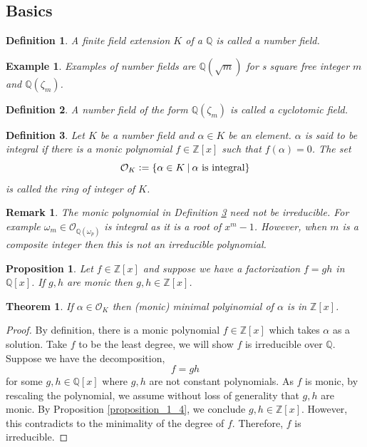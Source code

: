 \documentclass[10pt]{article}
\newtheorem{theorem}{Theorem} [section]
\newtheorem{proposition}{Proposition}[section]
\newtheorem{definition}{Definition}[section]
\newtheorem{remark}{Remark}[section]
\newtheorem{example}{Example}[section]
\newcommand{\defeq}{\vcentcolon=}
\newcommand{\Z}[0]{\mathbb{Z}}
\newcommand{\Q}[0]{\mathbb{Q}}
\newcommand{\Ouv}[0]{\mathcal{O}}
\newcommand{\sep}[0]{\:|\:}
\begin{document}
\subsection{Basics}
\begin{definition}
\label{definition_1_1}
A finite field extension $K$ of a $\Q$ is called a number field.
\end{definition}
\begin{example}
    Examples of number fields are $\Q(\sqrt{m})$ for s square free integer $m$ and $\Q(\zeta_m)$.
\end{example}
\begin{definition}
    A number field of the form $\Q(\zeta_m)$ is called a cyclotomic field.
\end{definition}
\begin{definition}
    \label{definition_1_2}
    Let $K$ be a number field and $\alpha\in K$ be an element. $\alpha$ is said to be integral if there is a monic polynomial $f\in\Z[x]$ such that $f(\alpha) = 0$. The set 
    \begin{equation*}
        \Ouv_K\defeq\{\alpha\in K\sep \text{$\alpha$ is integral}\}
    \end{equation*}
    is called the ring of integer of $K$.
\end{definition}
\begin{remark}
    The monic polynomial in Definition \ref{definition_1_2} need not be irreducible. For example $\omega_m\in\Ouv_{\Q(\omega_p)}$ is integral as it is a root of $x^m-1$. However, when $m$ is a composite integer then this is not an irreducible polynomial.
\end{remark}
\begin{proposition}
    \label{fact_1_4}
    \label{proposition_1_4}
    Let $f\in\Z[x]$ and suppose we have a factorization $f=gh$ in $\Q[x]$. If $g,h$ are monic then $g,h\in\Z[x]$.
\end{proposition}
\begin{theorem}
    \label{theorem_1_3}
    If $\alpha\in\Ouv_K$ then (monic) minimal polyinomial of $\alpha$ is in $\Z[x]$. 
\end{theorem}
\begin{proof}
By definition, there is a monic polynomial $f\in\Z[x]$ which takes $\alpha$ as a solution. Take $f$ to be the least degree, we will show $f$ is irreducible over $\Q$. Suppose we have the decomposition,
\begin{equation*}
    f = gh
\end{equation*}
for some $g,h\in \Q[x]$ where $g,h$ are not constant polynomials. As $f$ is monic, by rescaling the polynomial, we assume without loss of generality that $g,h$ are monic. By Proposition \ref{proposition_1_4}, we conclude $g,h\in\Z[x]$. However, this contradicts to the minimality of the degree of $f$. Therefore, $f$ is irreducible.
\end{proof}
\end{document}

